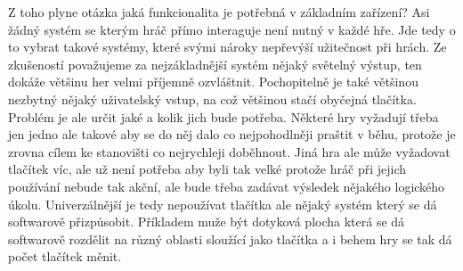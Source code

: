 Z toho plyne otázka jaká funkcionalita je potřebná v základním zařízení?
Asi žádný systém se kterým hráč přímo interaguje není nutný v každé hře.
Jde tedy o to vybrat takové systémy, které svými nároky nepřevýší užitečnost při hrách.
Ze zkušeností považujeme za nejzákladnější systém nějaký světelný výstup, ten dokáže většinu her velmi příjemně ozvláštnit.
Pochopitelně je také většinou nezbytný nějaký uživatelský vstup, na což většinou stačí obyčejná tlačítka.
Problém je ale určit jaké a kolik jich bude potřeba.
Některé hry vyžadují třeba jen jedno ale takové aby se do něj dalo co nejpohodlněji praštit v běhu, protože je zrovna cílem ke stanovišti co nejrychleji doběhnout.
Jiná hra ale může vyžadovat tlačítek víc, ale už není potřeba aby byli tak velké protože hráč při jejich používání nebude tak akční, ale bude třeba zadávat výsledek nějakého logického úkolu.
Univerzálnější je tedy nepoužívat tlačítka ale nějaký systém který se dá softwarově přizpůsobit.
Příkladem muže být dotyková plocha která se dá softwarově rozdělit na různý oblasti sloužící jako tlačítka a i behem hry se tak dá počet tlačítek měnit.











